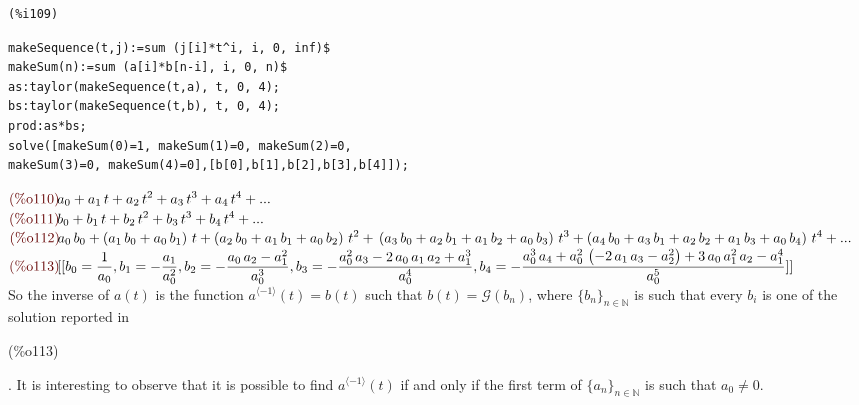 \noindent
\begin{minipage}[t]{8ex}{\color{red}\bf
\begin{verbatim}
(%i109) 
\end{verbatim}}
\end{minipage}
\begin{minipage}[t]{\textwidth}{\color{blue}
\begin{verbatim}
makeSequence(t,j):=sum (j[i]*t^i, i, 0, inf)$
makeSum(n):=sum (a[i]*b[n-i], i, 0, n)$
as:taylor(makeSequence(t,a), t, 0, 4);
bs:taylor(makeSequence(t,b), t, 0, 4);
prod:as*bs;
solve([makeSum(0)=1, makeSum(1)=0, makeSum(2)=0,
makeSum(3)=0, makeSum(4)=0],[b[0],b[1],b[2],b[3],b[4]]);
\end{verbatim}}
\end{minipage}
\begin{math}\displaystyle
\parbox{8ex}{\color{labelcolor}(\%o110) }
{a}_{0}+{a}_{1}\,t+{a}_{2}\,{t}^{2}+{a}_{3}\,{t}^{3}+{a}_{4}\,{t}^{4}+...
\end{math}\\
\begin{math}\displaystyle
\parbox{8ex}{\color{labelcolor}(\%o111) }
{b}_{0}+{b}_{1}\,t+{b}_{2}\,{t}^{2}+{b}_{3}\,{t}^{3}+{b}_{4}\,{t}^{4}+...
\end{math}\\
\begin{math}\displaystyle
\parbox{8ex}{\color{labelcolor}(\%o112) }
{a}_{0}\,{b}_{0}+\left( {a}_{1}\,{b}_{0}+{a}_{0}\,{b}_{1}\right)
\,t+\left( {a}_{2}\,{b}_{0}+{a}_{1}\,{b}_{1}+{a}_{0}\,{b}_{2}\right)
\,{t}^{2}+\\
\left( {a}_{3}\,{b}_{0}+{a}_{2}\,{b}_{1}+{a}_{1}\,{b}_{2}+{a}_{0}\,{b}_{3}\right) \,{t}^{3}+\left( {a}_{4}\,{b}_{0}+{a}_{3}\,{b}_{1}+{a}_{2}\,{b}_{2}+{a}_{1}\,{b}_{3}+{a}_{0}\,{b}_{4}\right) \,{t}^{4}+...
\end{math}\\
\begin{math}\displaystyle
  \parbox{8ex}{\color{labelcolor}(\%o113) }
  [[{b}_{0}=\frac{1}{{a}_{0}},{b}_{1}=-\frac{{a}_{1}}{{a}_{0}^{2}},{b}_{2}=-\frac{{a}_{0}\,{a}_{2}-{a}_{1}^{2}}{{a}_{0}^{3}},{b}_{3}=-\frac{{a}_{0}^{2}\,{a}_{3}-2\,{a}_{0}\,{a}_{1}\,{a}_{2}+{a}_{1}^{3}}{{a}_{0}^{4}},\\
  {b}_{4}=-\frac{{a}_{0}^{3}\,{a}_{4}+{a}_{0}^{2}\,\left(
      -2\,{a}_{1}\,{a}_{3}-{a}_{2}^{2}\right)
    +3\,{a}_{0}\,{a}_{1}^{2}\,{a}_{2}-{a}_{1}^{4}}{{a}_{0}^{5}}]]
\end{math}\\
So the inverse of $a(t)$ is the function $a^{\langle -1\rangle}(t)=
b(t)$ such that $b(t)= \mathcal{G} (b_n )$, where
$\{b_n\}_{n\in\mathbb{N} } $ is such that every $b_i$ is one of the
solution reported in \parbox{8ex}{\color{labelcolor}(\%o113) }. It is
interesting to observe that it is possible to find $a^{\langle
  -1\rangle}(t)$ if and only if the first term of
$\{a_n\}_{n\in\mathbb{N} } $ is such that $a_0 \not = 0$.


